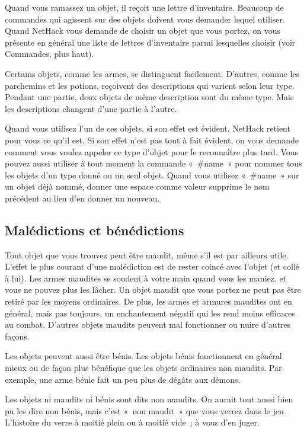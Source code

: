 \documentclass[titlepage]{article}
\begin{document}
Quand vous ramassez un objet, il reçoit une lettre d'inventaire.
Beaucoup de commandes qui agissent sur des objets doivent vous demander
lequel utiliser.
Quand NetHack vous demande de choisir un objet que vous portez, on vous
présente en général une liste de lettres d'inventaire parmi lesquelles
choisir (voir Commandes, plus haut).


Certains objets, comme les armes, se distinguent facilement.
D'autres, comme les parchemins et les potions, reçoivent des descriptions
qui varient selon leur type.
Pendant une partie, deux objets de même description sont du même type.
Mais les descriptions changent d'une partie à l'autre.


Quand vous utilisez l'un de ces objets, si son effet est évident, NetHack
retient pour vous ce qu'il est.
Si son effet n'est pas tout à fait évident, on vous demande comment vous
voulez appeler ce type d'objet pour le reconnaître plus tard.
Vous pouvez aussi utiliser à tout moment la commande «~\#name~» pour
nommer tous les objets d'un type donné ou un seul objet.
Quand vous utilisez «~\#name~» sur un objet déjà nommé, donner une
espace comme valeur supprime le nom précédent au lieu d'en donner un
nouveau.

\subsection{Malédictions et bénédictions}



Tout objet que vous trouvez peut être maudit, même s'il est par ailleurs
utile.
L'effet le plus courant d'une malédiction est de rester coincé avec
l'objet (et collé à lui).
Les armes maudites se soudent à votre main quand vous les maniez, et vous
ne pouvez plus les lâcher.
Un objet maudit que vous portez ne peut pas être retiré par les moyens
ordinaires.
De plus, les armes et armures maudites ont en général, mais pas toujours,
un enchantement négatif qui les rend moins efficaces au combat.
D'autres objets maudits peuvent mal fonctionner ou nuire d'autres façons.


Les objets peuvent aussi être bénis.
Les objets bénis fonctionnent en général mieux ou de façon plus bénéfique
que les objets ordinaires non maudits.
Par exemple, une arme bénie fait un peu plus de dégâts aux démons.


Les objets ni maudits ni bénis sont dits non maudits.
On aurait tout aussi bien pu les dire non bénis, mais c'est «~non
maudit~» que vous verrez dans le jeu.
L'histoire du verre à moitié plein ou à moitié vide~; à vous d'en
juger.
\end{document}
